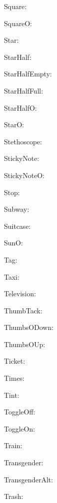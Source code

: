 \documentclass{article}
\begin{document}
      Square: \faSquare\ 

      SquareO: \faSquareO\ 

      Star: \faStar\ 

      StarHalf: \faStarHalf\ 

      StarHalfEmpty: \faStarHalfEmpty\ 

      StarHalfFull: \faStarHalfFull\ 

      StarHalfO: \faStarHalfO\ 

      StarO: \faStarO\ 

      Stethoscope: \faStethoscope\ 

      StickyNote: \faStickyNote\ 

      StickyNoteO: \faStickyNoteO\ 

      Stop: \faStop\ 

      Subway: \faSubway\ 

      Suitcase: \faSuitcase\ 

      SunO: \faSunO\ 

      Tag: \faTag\ 

      Taxi: \faTaxi\ 

      Television: \faTelevision\ 

      ThumbTack: \faThumbTack\ 

      ThumbsODown: \faThumbsODown\ 

      ThumbsOUp: \faThumbsOUp\ 

      Ticket: \faTicket\ 

      Times: \faTimes\ 

      Tint: \faTint\ 

      ToggleOff: \faToggleOff\ 

      ToggleOn: \faToggleOn\ 

      Train: \faTrain\ 

      Transgender: \faTransgender\ 

      TransgenderAlt: \faTransgenderAlt\ 

      Trash: \faTrash\ 
\end{document}
